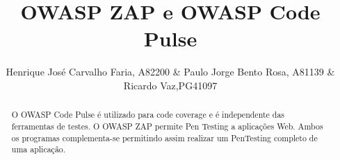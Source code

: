%
\title{OWASP ZAP e OWASP Code Pulse}
%
%

\author{Henrique José Carvalho Faria, A82200 \&  Paulo Jorge Bento Rosa, A81139 \& Ricardo Vaz,PG41097}
%
%
%
\maketitle              %
%
\begin{abstract}

O OWASP Code Pulse é utilizado para code coverage e é independente das ferramentas de testes. O OWASP ZAP permite Pen Testing a aplicações Web. Ambos os programas complementa-se permitindo assim realizar um PenTesting completo de uma aplicação.

\end{abstract}
%
%








